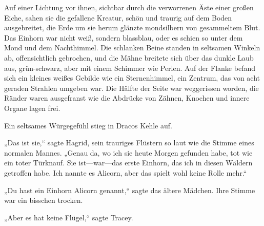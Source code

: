 Auf einer Lichtung vor ihnen, sichtbar durch die verworrenen Äste einer großen Eiche, sahen sie die gefallene Kreatur, schön und traurig auf dem Boden ausgebreitet, die Erde um sie herum glänzte mondsilbern von gesammeltem Blut. Das Einhorn war nicht weiß, sondern blassblau, oder es schien so unter dem Mond und dem Nachthimmel. Die schlanken Beine standen in seltsamen Winkeln ab, offensichtlich gebrochen, und die Mähne breitete sich über das dunkle Laub aus, grün-schwarz, aber mit einem Schimmer wie Perlen. Auf der Flanke befand sich ein kleines weißes Gebilde wie ein Sternenhimmel, ein Zentrum, das von acht geraden Strahlen umgeben war. Die Hälfte der Seite war weggerissen worden, die Ränder waren ausgefranst wie die Abdrücke von Zähnen, Knochen und innere Organe lagen frei.

Ein seltsames Würgegefühl stieg in Dracos Kehle auf.

„Das ist sie,“ sagte Hagrid, sein trauriges Flüstern so laut wie die Stimme eines normalen Mannes. „Genau da, wo ich sie heute Morgen gefunden habe, tot wie ein toter Türknauf. Sie ist—war—das erste Einhorn, das ich in diesen Wäldern getroffen habe. Ich nannte es Alicorn, aber das spielt wohl keine Rolle mehr.“

„Du hast ein Einhorn Alicorn genannt,“ sagte das ältere Mädchen. Ihre Stimme war ein bisschen trocken.

„Aber es hat keine Flügel,“ sagte Tracey.

